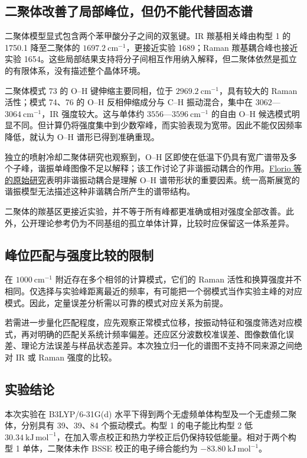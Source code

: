 \documentclass[a4paper,12pt]{article}
\begin{document}
\subsection{二聚体改善了局部峰位，但仍不能代替固态谱}

二聚体模型显式包含两个苯甲酸分子之间的双氢键。IR 羰基相关峰由构型 1 的 1750.1 降至二聚体的 $1697.2\ \mathrm{cm^{-1}}$，更接近实验 1689；Raman 羰基耦合峰也接近实验 1654。这些局部结果支持将分子间相互作用纳入解释，但二聚体依然是孤立的有限体系，没有描述整个晶体环境。

二聚体模式 73 的 O–H 键伸缩主要同相，位于 $2969.2\ \mathrm{cm^{-1}}$，具有较大的 Raman 活性；模式 74、76 的 O–H 反相伸缩成分与 C–H 振动混合，集中在 $3062$—$3064\ \mathrm{cm^{-1}}$，IR 强度较大。这与单体约 $3556$—$3596\ \mathrm{cm^{-1}}$ 的自由 O–H 候选模式明显不同。但计算仍将强度集中到少数窄峰，而实验表现为宽带。因此不能仅因频率降低，就认为 O–H 谱形已得到准确重现。

独立的喷射冷却二聚体研究也观察到，O–H 区即使在低温下仍具有宽广谱带及多个子峰，谐振单峰图像不足以解释；该工作讨论了非谐振动耦合的作用。\href{https://doi.org/10.1039/b009594j}{Florio 等的原始研究}\cite{ref5}表明非谐振动耦合是理解 O–H 谱带形状的重要因素。统一高斯展宽的谐振模型无法描述这种非谐耦合所产生的谱带结构。

二聚体的羰基区更接近实验，并不等于所有峰都更准确或相对强度全部改善。此外，公开理论参考仍为不同基组的孤立单体计算，比较时应保留这一体系差异。

\subsection{峰位匹配与强度比较的限制}

在 $1000\ \mathrm{cm^{-1}}$ 附近存在多个相邻的计算模式，它们的 Raman 活性和换算强度并不相同。仅选择与实验峰距离最近的频率，有可能把一个弱模式当作实验主峰的对应模式。因此，定量误差分析需以可靠的模式对应关系为前提。

若需进一步量化匹配程度，应先观察正常模式位移，按振动特征和强度筛选对应模式，再对明确的匹配关系统计频率偏差。还应区分波数校准误差、图像数值化误差、理论方法误差与样品状态差异。本次独立归一化的谱图不支持不同来源之间绝对 IR 或 Raman 强度的比较。

\subsection{实验结论}

本次实验在 B3LYP/6-31G(d) 水平下得到两个无虚频单体构型及一个无虚频二聚体，分别具有 39、39、84 个振动模式。构型 1 的电子能比构型 2 低 $30.34\ \mathrm{kJ\,mol^{-1}}$，在加入零点校正和热力学校正后仍保持较低能量。相对于两个构型 1 单体，二聚体未作 BSSE 校正的电子缔合能约为 $-83.80\ \mathrm{kJ\,mol^{-1}}$。
\end{document}
